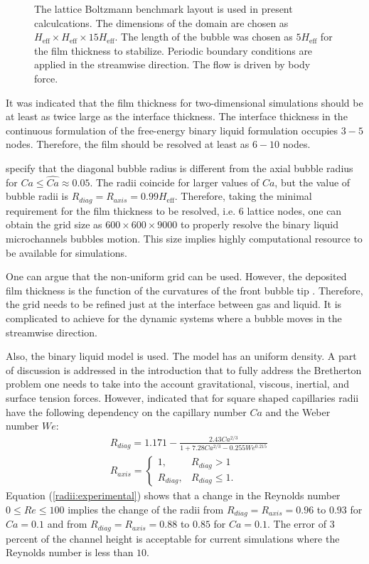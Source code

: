 \documentclass{article}
\begin{document}
\begin{figure}[ht]
\caption{The lattice Boltzmann benchmark layout is used in present calculcations. The dimensions of
the domain are chosen as $H_{\mathrm{eff}}\times H_{\mathrm{eff}}\times 15 H_{\mathrm{eff}}$. The
length of the bubble was chosen as $5 H_{\mathrm{eff}}$ for the film thickness to stabilize.
Periodic boundary conditions are applied in the streamwise direction. The flow is driven by body
force. \label{fig:lbm:benchmark}}
\end{figure}

It was indicated \cite{kuzmin-binary2d} that the film thickness for two-dimensional simulations should be at least as twice large
as the interface thickness. The interface thickness in the continuous formulation of the
free-energy binary liquid formulation occupies $3-5$ nodes. Therefore, the film should be
resolved at least as $6-10$ nodes. 

\cite{heil-threedim} specify that the diagonal bubble radius is different from the
axial bubble radius for $Ca\leq \widehat{Ca}\approx 0.05$. The radii coincide for larger values of
$Ca$, but the value of bubble radii is $R_{diag}=R_{axis}=0.99 H_{\mathrm{eff}}$. Therefore, taking the minimal requirement for the film thickness to be
resolved, i.e. $6$ lattice nodes, one can obtain the grid size as $600\times 600 \times 9000 $ to
properly resolve the binary liquid microchannels bubbles motion. This size implies highly
computational resource to be available for simulations.

One can argue that the non-uniform grid can be used. However, the deposited film thickness is the
function of the curvatures of the front bubble tip \cite{bretherton}. Therefore, the grid needs to
be refined just at the interface between gas and liquid. It is complicated to achieve for the
dynamic systems where a bubble moves in the streamwise direction.

Also, the binary liquid model is used. The model has an uniform density. A part of discussion is
addressed in the introduction that to fully address the Bretherton problem one needs to take into
the account gravitational, viscous, inertial, and surface tension forces. However, 
\citet{shikazono-square} indicated that for square shaped capillaries radii have the
following dependency on the capillary number $Ca$ and the Weber number $We$:
\begin{equation}
\label{radii:experimental}
\begin{aligned}
&R_{diag}=1.171-\frac{2.43 Ca^{2/3}}{1+7.28 Ca^{2/3}-0.255 We^{0.215}}\\
&R_{axis}=
\begin{cases}
1, &R_{diag}>1\\
R_{diag}, &R_{diag}\leq 1.
\end{cases}
\end{aligned}
\end{equation}
Equation (\ref{radii:experimental}) shows that a change in the Reynolds number $0\leq Re \leq 100$
implies the change of the radii from $R_{diag}=R_{axis}=0.96$ to $0.93$ for $Ca=0.1$ and from
$R_{diag}=R_{axis}=0.88$ to $0.85$ for $Ca=0.1$. The error of $3$ percent of the channel height is
acceptable for current simulations where the Reynolds number is less than $10$.
\end{document}
